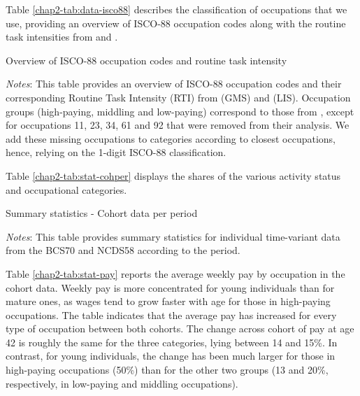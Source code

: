 Table \ref{chap2-tab:data-isco88} describes the classification of occupations that we use, providing an overview of ISCO-88 occupation codes along with the routine task intensities from \cite{Goos2014Explaining} and \cite{Mahutga2018Job}.
\begin{table}[!htb]
    \centering
    \begin{threeparttable}
        \caption{Overview of ISCO-88 occupation codes and routine task intensity}
        \label{chap2-tab:data-isco88}
        
        \begin{tablenotes}[flushleft]
            \footnotesize{\item \textit{Notes}: This table provides an overview of ISCO-88 occupation codes and their corresponding Routine Task Intensity (RTI) from \cite{Goos2014Explaining} (GMS) and \cite{Mahutga2018Job} (LIS). Occupation groups (high-paying, middling and low-paying) correspond to those from \cite{Goos2014Explaining}, except for occupations 11, 23, 34, 61 and 92 that were removed from their analysis. We add these missing occupations to categories according to closest occupations, hence, relying on the 1-digit ISCO-88 classification.}
        \end{tablenotes}
    \end{threeparttable}
\end{table}
Table \ref{chap2-tab:stat-cohper} displays the shares of the various activity status and occupational categories.
\begin{table}[!htb]
    \centering
    \caption{Summary statistics - Cohort data per period}
    \label{chap2-tab:stat-cohper}
    \begin{threeparttable}
        
        \begin{tablenotes}[flushleft]
            \footnotesize{\item \textit{Notes}: This table provides summary statistics for individual time-variant data from the BCS70 and NCDS58 according to the period.}
        \end{tablenotes}
    \end{threeparttable}
\end{table}
Table \ref{chap2-tab:stat-pay} reports the average weekly pay by occupation in the cohort data. Weekly pay is more concentrated for young individuals than for mature ones, as wages tend to grow faster with age for those in high-paying occupations. The table indicates that the average pay has increased for every type of occupation between both cohorts. The change across cohort of pay at age 42 is roughly the same for the three categories, lying between 14 and 15\%. In contrast, for young individuals, the change has been much larger for those in high-paying occupations (50\%) than for the other two groups (13 and 20\%, respectively, in low-paying and middling occupations).

